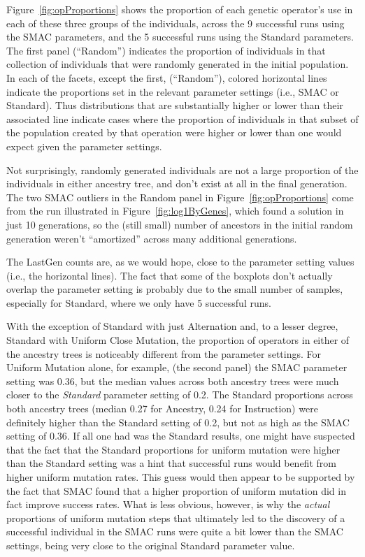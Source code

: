 Figure~\ref{fig:opProportions} shows the proportion of each genetic 
operator's use in each of these three groups of the individuals, across
the 9 successful runs using the SMAC parameters, and the 5 successful runs
using the Standard parameters. The first
panel (``Random'') indicates the proportion of individuals in that collection
of individuals that were randomly generated in the initial population. 
In each of
the facets, except the first, (``Random''), colored horizontal lines indicate
the proportions set in the relevant parameter settings (i.e., SMAC or
Standard). Thus distributions that are substantially higher or lower than
their associated line indicate cases where the proportion of individuals in
that subset of the population created by that operation were higher or
lower than one would expect given the parameter settings.

Not surprisingly, randomly generated individuals are not a large
proportion of the individuals in either ancestry tree, and don't exist
at all in the final generation. The two SMAC outliers in the Random panel in Figure~\ref{fig:opProportions} come from the run
illustrated in Figure~\ref{fig:log1ByGenes}, which found a solution in 
just 10 generations, so the (still small) number
of ancestors in the initial random generation weren't ``amortized''
across many additional generations.

The LastGen counts are, as we would hope, close to the parameter
setting values (i.e., the horizontal lines). The fact that some of the
boxplots don't actually overlap the parameter setting is probably due
to the small number of samples, especially for Standard, where we only
have 5 successful runs.

With the exception of Standard with just Alternation and, to a
lesser degree, Standard with Uniform Close Mutation, the proportion
of operators in either of the ancestry trees is noticeably
different from the parameter settings. For Uniform Mutation alone, for 
example, (the second panel) the SMAC parameter setting
was 0.36, but the median values across both ancestry trees were much closer to
the \emph{Standard} parameter setting of 0.2. The Standard proportions across
both ancestry trees (median 0.27 for Ancestry, 0.24 for Instruction) were definitely higher than the Standard setting of 0.2, but not as high as the
SMAC setting of 0.36. If all one had was the Standard results, one might 
have suspected that the fact that
the Standard proportions for uniform mutation were higher than the Standard
setting was a hint that successful runs would benefit from higher uniform
mutation rates. This guess would then appear to be supported by the fact
that SMAC found that a higher proportion of uniform mutation did in fact
improve success rates. What is less obvious, however, is why the \emph{actual}
proportions of uniform mutation steps that ultimately led to the discovery of
a successful individual in the SMAC runs were quite a bit lower than the SMAC
settings, being very close to the original Standard parameter value.

